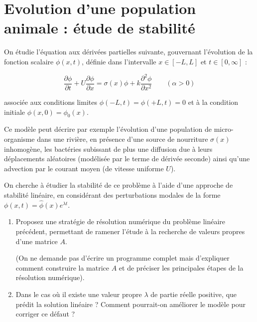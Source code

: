 \documentclass[a4paper,11pt]{article}
\begin{document}
\section{Evolution d'une population animale : étude de stabilité}



On étudie l'équation aux dérivées partielles suivante, gouvernant l'évolution de la fonction scalaire $\phi(x,t)$, définie dans l'intervalle $x\in [-L,L]$ et $t\in [0,\infty]$ :

\begin{equation}
\frac{\partial \phi}{\partial t} + U \frac{\partial \phi}{\partial x} =  \sigma(x) \phi + k \frac{\partial^2 \phi}{\partial x^2}  
\quad \quad (\alpha >0)
\end{equation}


associée aux conditions limites $\phi(-L,t) = \phi(+L,t) = 0$ et à la condition initiale $\phi(x,0) = \phi_0(x)$.

Ce modèle peut décrire par exemple l'évolution d'une population de micro-organisme dans une rivière, en présence d'une source de nourriture $\sigma(x)$ inhomogène, les bactéries subissant de plus une diffusion due à leurs déplacements aléatoires (modélisée par le terme de dérivée seconde) ainsi qu'une advection par le courant moyen (de vitesse uniforme $U$).

On cherche à étudier la stabilité de ce problème à l'aide d'une approche de stabilité linéaire, en considérant des perturbations modales de la forme
$\phi(x,t) = \hat{\phi}(x) e^{\lambda t}$.



\begin{enumerate}


\item Proposez une stratégie de résolution numérique du problème linéaire précédent, permettant de ramener l'étude à la recherche de valeurs propres 
d'une matrice $A$. 

(On ne demande pas d'écrire un programme complet mais d'expliquer comment construire la matrice $A$ et de préciser les principales étapes de la résolution numérique).


\item Dans le cas où il existe une valeur propre $\lambda$ de partie réelle positive, que prédit la solution linéaire ? Comment pourrait-on améliorer le modèle pour corriger ce défaut ?




\end{enumerate}
\end{document}
